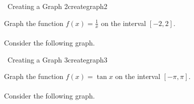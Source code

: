 		\begin{example}{\Difficulty\,\Difficulty\,\,Creating a Graph 2}{creategraph2}

			Graph the function \(f(x)=\frac{1}{x}\) on the interval \([-2,2]\).
			\\
			\\
			Consider the following graph.
			\begin{center}
			\end{center}
			
		\end{example}
		\pagebreak
		\begin{example}{\Difficulty\,\Difficulty\,\,Creating a Graph 3}{creategraph3}

			Graph the function \(f(x)=\tan x\) on the interval \([-\pi,\pi]\).
			\\
			\\
			Consider the following graph.
			\begin{center}
			\end{center}
			
		\end{example}
